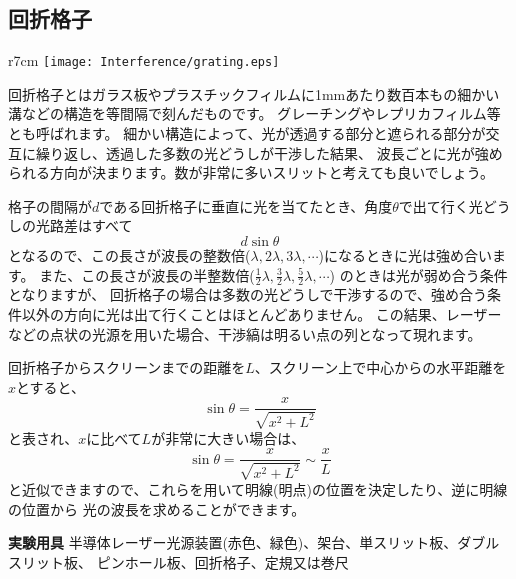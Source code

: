 \subsection{回折格子}

\begin{wrapfigure}[10]{r}{7cm}
\vspace*{-0.5cm}
\texttt{[image: Interference/grating.eps]}
\end{wrapfigure}


回折格子とはガラス板やプラスチックフィルムに1mmあたり数百本もの細かい溝などの構造を等間隔で刻んだものです。
グレーチングやレプリカフィルム等とも呼ばれます。
細かい構造によって、光が透過する部分と遮られる部分が交互に繰り返し、透過した多数の光どうしが干渉した結果、
波長ごとに光が強められる方向が決まります。数が非常に多いスリットと考えても良いでしょう。

格子の間隔が$d$である回折格子に垂直に光を当てたとき、角度$\theta$で出て行く光どうしの光路差はすべて
\[
d\sin\theta
\]
となるので、この長さが波長の整数倍($\lambda,2\lambda,3\lambda,\cdots$)になるときに光は強め合います。
また、この長さが波長の半整数倍($\frac{1}{2}\lambda,\frac{3}{2}\lambda,\frac{5}{2}\lambda,\cdots$)
のときは光が弱め合う条件となりますが、
回折格子の場合は多数の光どうしで干渉するので、強め合う条件以外の方向に光は出て行くことはほとんどありません。
この結果、レーザーなどの点状の光源を用いた場合、干渉縞は明るい点の列となって現れます。

回折格子からスクリーンまでの距離を$L$、スクリーン上で中心からの水平距離を$x$とすると、
\[
\sin \theta = \frac{x}{\sqrt{x^2+L^2}}
\]
と表され、$x$に比べて$L$が非常に大きい場合は、
\[
\sin \theta = \frac{x}{\sqrt{x^2+L^2}} \sim \frac{x}{L}
\]
と近似できますので、これらを用いて明線(明点)の位置を決定したり、逆に明線の位置から
光の波長を求めることができます。






\newpage

\jikken

\begin{itemsquarebox}[c]{\bf 実験用具}
半導体レーザー光源装置(赤色、緑色)、架台、単スリット板、ダブルスリット板、
ピンホール板、回折格子、定規又は巻尺
\end{itemsquarebox}

\bigskip


